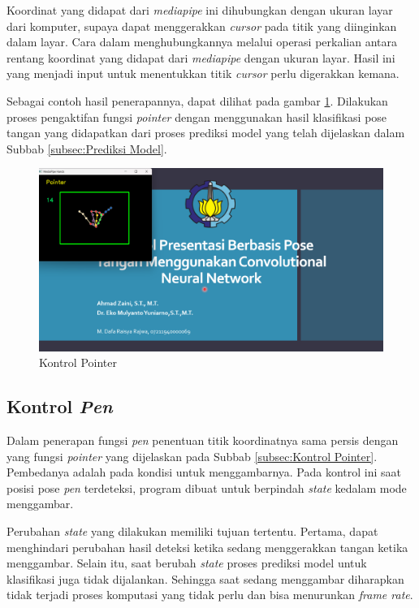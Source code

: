 Koordinat yang didapat dari \emph{mediapipe} ini dihubungkan dengan ukuran layar dari komputer, supaya dapat menggerakkan \emph{cursor} pada titik yang diinginkan dalam layar. Cara dalam menghubungkannya melalui operasi perkalian antara rentang koordinat yang didapat dari \emph{mediapipe} dengan ukuran layar. Hasil ini yang menjadi input untuk menentukkan titik \emph{cursor} perlu digerakkan kemana.

Sebagai contoh hasil penerapannya, dapat dilihat pada gambar \ref{fig:Kontrol Pointer}. Dilakukan proses pengaktifan fungsi \emph{pointer} dengan menggunakan hasil klasifikasi pose tangan yang didapatkan dari proses prediksi model yang telah dijelaskan dalam Subbab \ref{subsec:Prediksi Model}.

\begin{figure}[ht]
  \centering
  \includegraphics[scale=0.38]{gambar/hasil-kontrol-PPT.png}
  \caption{Kontrol Pointer}
  \label{fig:Kontrol Pointer}
\end{figure}

\subsection{Kontrol \emph{Pen}}
\label{subsec:Kontrol Pen}

Dalam penerapan fungsi \emph{pen} penentuan titik koordinatnya sama persis dengan yang fungsi \emph{pointer} yang dijelaskan pada Subbab \ref{subsec:Kontrol Pointer}. Pembedanya adalah pada kondisi untuk menggambarnya. Pada kontrol ini saat posisi pose \emph{pen} terdeteksi, program dibuat untuk berpindah \emph{state} kedalam mode menggambar.

Perubahan \emph{state} yang dilakukan memiliki tujuan tertentu. Pertama, dapat menghindari perubahan hasil deteksi ketika sedang menggerakkan tangan ketika menggambar. Selain itu, saat berubah \emph{state} proses prediksi model untuk klasifikasi juga tidak dijalankan. Sehingga saat sedang menggambar diharapkan tidak terjadi proses komputasi yang tidak perlu dan bisa menurunkan \emph{frame rate}.

